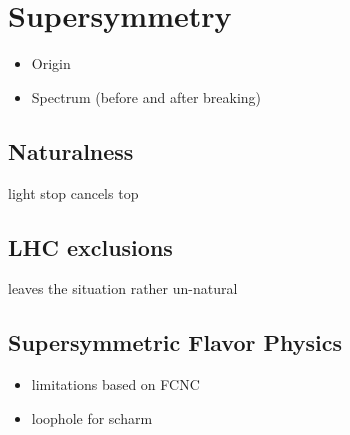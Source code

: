 \section{Supersymmetry}
\begin{itemize}
\item Origin
\item Spectrum (before and after breaking)
\end{itemize}

\subsection{Naturalness}
light stop cancels top
\subsection{LHC exclusions}
leaves the situation rather un-natural
\subsection{Supersymmetric Flavor Physics}
\begin{itemize}
\item limitations based on FCNC
\item loophole for scharm
\end{itemize}
